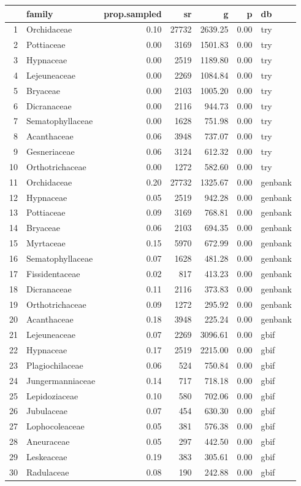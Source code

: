 \begin{tabular}{rlrrrrl}
  \toprule
 & family & prop.sampled & sr & g & p & db \\ 
  \midrule
1 & Orchidaceae & 0.10 & 27732 & 2639.25 & 0.00 & try \\ 
  2 & Pottiaceae & 0.00 & 3169 & 1501.83 & 0.00 & try \\ 
  3 & Hypnaceae & 0.00 & 2519 & 1189.80 & 0.00 & try \\ 
  4 & Lejeuneaceae & 0.00 & 2269 & 1084.84 & 0.00 & try \\ 
  5 & Bryaceae & 0.00 & 2103 & 1005.20 & 0.00 & try \\ 
  6 & Dicranaceae & 0.00 & 2116 & 944.73 & 0.00 & try \\ 
  7 & Sematophyllaceae & 0.00 & 1628 & 751.98 & 0.00 & try \\ 
  8 & Acanthaceae & 0.06 & 3948 & 737.07 & 0.00 & try \\ 
  9 & Gesneriaceae & 0.06 & 3124 & 612.32 & 0.00 & try \\ 
  10 & Orthotrichaceae & 0.00 & 1272 & 582.60 & 0.00 & try \\ 
  11 & Orchidaceae & 0.20 & 27732 & 1325.67 & 0.00 & genbank \\ 
  12 & Hypnaceae & 0.05 & 2519 & 942.28 & 0.00 & genbank \\ 
  13 & Pottiaceae & 0.09 & 3169 & 768.81 & 0.00 & genbank \\ 
  14 & Bryaceae & 0.06 & 2103 & 694.35 & 0.00 & genbank \\ 
  15 & Myrtaceae & 0.15 & 5970 & 672.99 & 0.00 & genbank \\ 
  16 & Sematophyllaceae & 0.07 & 1628 & 481.28 & 0.00 & genbank \\ 
  17 & Fissidentaceae & 0.02 & 817 & 413.23 & 0.00 & genbank \\ 
  18 & Dicranaceae & 0.11 & 2116 & 373.83 & 0.00 & genbank \\ 
  19 & Orthotrichaceae & 0.09 & 1272 & 295.92 & 0.00 & genbank \\ 
  20 & Acanthaceae & 0.18 & 3948 & 225.24 & 0.00 & genbank \\ 
  21 & Lejeuneaceae & 0.07 & 2269 & 3096.61 & 0.00 & gbif \\ 
  22 & Hypnaceae & 0.17 & 2519 & 2215.00 & 0.00 & gbif \\ 
  23 & Plagiochilaceae & 0.06 & 524 & 750.84 & 0.00 & gbif \\ 
  24 & Jungermanniaceae & 0.14 & 717 & 718.18 & 0.00 & gbif \\ 
  25 & Lepidoziaceae & 0.10 & 580 & 702.06 & 0.00 & gbif \\ 
  26 & Jubulaceae & 0.07 & 454 & 630.30 & 0.00 & gbif \\ 
  27 & Lophocoleaceae & 0.05 & 381 & 576.38 & 0.00 & gbif \\ 
  28 & Aneuraceae & 0.05 & 297 & 442.50 & 0.00 & gbif \\ 
  29 & Leskeaceae & 0.19 & 383 & 305.61 & 0.00 & gbif \\ 
  30 & Radulaceae & 0.08 & 190 & 242.88 & 0.00 & gbif \\ 
   \bottomrule
\end{tabular}
